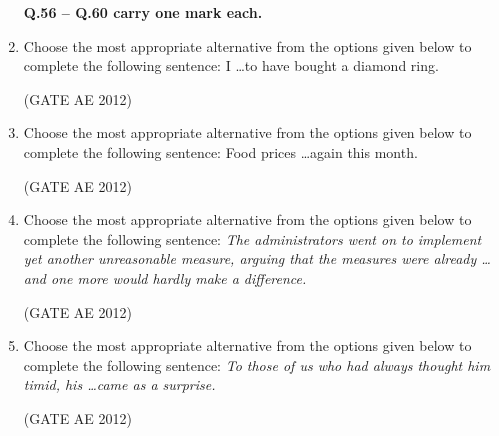 \documentclass[journal,12pt,onecolumn]{IEEEtran}
\theoremstyle{remark}
\begin{document}
\begin{enumerate}
\textbf{Q.56 -- Q.60 carry one mark each.}

\item Choose the most appropriate alternative from the options given below to complete the following sentence:
I \dots to have bought a diamond ring.
\begin{enumerate}
\end{enumerate}
\hfill(GATE AE 2012)



\item Choose the most appropriate alternative from the options given below to complete the following sentence:
Food prices \dots again this month.
\begin{enumerate}
\end{enumerate}
\hfill(GATE AE 2012)



\item Choose the most appropriate alternative from the options given below to complete the following sentence:
\textit{The administrators went on to implement yet another unreasonable measure, arguing that the measures were already \dots and one more would hardly make a difference.}
\begin{enumerate}
\end{enumerate}
\hfill(GATE AE 2012)



\item Choose the most appropriate alternative from the options given below to complete the following sentence:
\textit{To those of us who had always thought him timid, his \dots came as a surprise.}
\begin{enumerate}
\end{enumerate}
\hfill(GATE AE 2012)




\end{enumerate}
\end{document}
